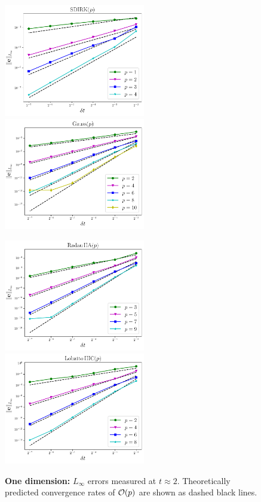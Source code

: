 \documentclass[review]{siamart}
\begin{document}
\begin{figure}
\centerline{
\includegraphics[width = 0.55\textwidth]{figures/SDIRK_d1_FD4}
\quad
\includegraphics[width = 0.55\textwidth]{figures/Gauss_d1_FD4}
}
\centerline{
\includegraphics[width = 0.55\textwidth]{figures/RadauIIA_d1_FD4}
\quad
\includegraphics[width = 0.55\textwidth]{figures/LobattoIIIC_d1_FD4}
}
\caption{\textbf{One dimension:} $L_{\infty}$ errors measured at $t \approx 2$. Theoretically predicted convergence rates of ${\cal O}(p)$ are shown as dashed black lines.
\label{fig:errors1D}
}
\end{figure}
\end{document}
